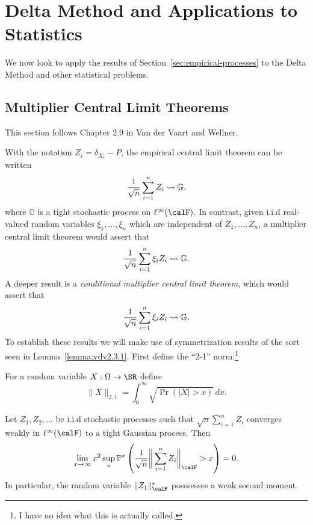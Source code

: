 \section{Delta Method and Applications to Statistics}
\label{sec:delta-applications}

We now look to apply the results of Section~\ref{sec:empirical-processes} to the Delta Method and other statistical problems. 

\subsection{Multiplier Central Limit Theorems}%
\label{subsec:mclt}

This section follows Chapter 2.9 in Van der Vaart and Wellner. 

With the notation \(Z_i = \delta_{X_i}-P\), the empirical central limit theorem can be written
\[
    \frac{1}{\sqrt{n}} \sum_{i=1}^n Z_i \rightsquigarrow \mathbb{G}
.\] 
where \(\mathbb{G}\) is a tight stochastic process on \(\ell^\infty(\calF)\). In contrast, given i.i.d real-valued random variables \(\xi_1,\dots,\xi_n\) which are independent of \(Z_1,\dots,Z_n\), a multiplier central limit theorem would assert that 
\[
    \frac{1}{\sqrt{n}}\sum_{i=1}^n \xi_iZ_i\rightsquigarrow \mathbb{G}
.\]
A deeper result is a \emph{conditional multiplier central limit theorem}, which would assert that 
\[
    \frac{1}{\sqrt{n}}\sum_{i=1}^n \xi_iZ_i\rightsquigarrow \mathbb{G}
.\] 
To establish these results we will make use of symmetrization results of the sort seen in Lemma~\ref{lemma:vdv2.3.1}. First define the ``2-1'' norm:\footnote{I have no idea what this is actually called.}
\begin{definition}[2-1 Norm]
	\label{def:21norm}
	For a random variable \(X:\Omega\to\SR\) define
	\[
		\|X\|_{2,1}=\int_{0}^{\infty} \sqrt{\Pr\left(|X|>x\right)}\,dx 
	.\] 
\end{definition}
\begin{lemma}
	\label{lemma:donsker-implication}
	Let \(Z_1,Z_2,\dots\) be i.i.d stochastic processes such that \(\sqrt{n}\sum_{i=1}^n Z_i\) converges weakly in \(\ell^\infty(\calF)\) to a tight Gaussian process. Then
	\[
		\lim_{x\to\infty}x^2\sup_n \P^\star\left(\frac{1}{\sqrt{n}}\bigg\|\sum_{i=1}^n Z_i\bigg\|_\calF > x\right) = 0
	.\] 
	In particular, the random variable \(\|Z_1\|^\star_\calF\) posssesses a weak second moment.
\end{lemma}
